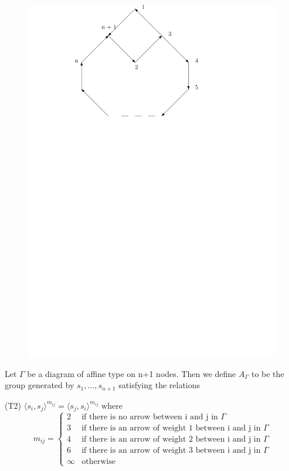 \documentclass{beamer}
\begin{document}
\begin{frame}
\begin{figure}
\includegraphics[scale = .30]{Diagram6.pdf}
\end{figure}
\end{frame}

\begin{frame}
Let $\Gamma$ be a diagram of affine type on n+1 nodes. Then we define $A_{\Gamma}$ to be the group generated by $s_{1}, \dots, s_{n+1}$ satisfying the relations

(T2) $\langle s_{i}, s_{j} \rangle^{m_{ij}} = \langle s_{j}, s_{i} \rangle^{m_{ij}}$ where
$$m_{ij} = 
\begin{cases}
2 &\text{if there is no arrow between i and j in $\Gamma$} \\
3 &\text{if there is an arrow of weight 1 between i and j in $\Gamma$} \\
4 &\text{if there is an arrow of weight 2 between i and j in $\Gamma$} \\
6 &\text{if there is an arrow of weight 3 between i and j in $\Gamma$} \\
\infty &\text{otherwise}
\end{cases}$$
\end{frame}
\end{document}
